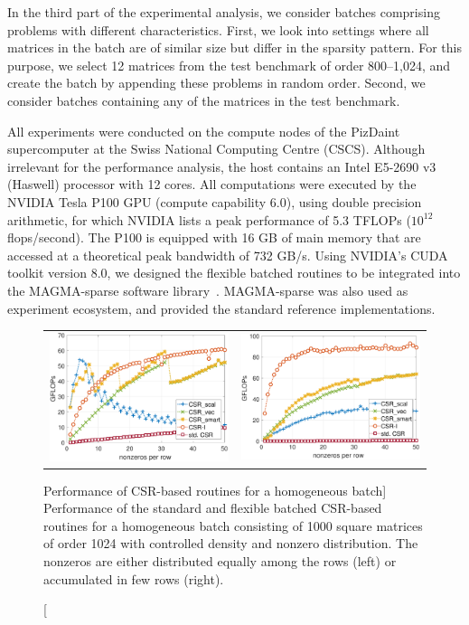 In the third part of the experimental analysis, we consider batches comprising 
problems
with different characteristics. First, we look into settings where all matrices 
in the batch are of
similar size but differ in the sparsity pattern. For this purpose, we select 12 
matrices from
the test benchmark of order
800--1,024, and create the batch by appending these problems in random order.
Second, we consider batches containing any of the matrices in the test 
benchmark.

All experiments were conducted on the compute nodes of the 
PizDaint supercomputer at the Swiss National Computing Centre (CSCS). 
Although irrelevant for the performance analysis, the host contains
an Intel E5-2690 v3 (Haswell) processor with 12 cores.
All computations were executed by the NVIDIA Tesla P100 GPU (compute capability 
6.0),
using double precision arithmetic,
for which NVIDIA lists a peak performance of 5.3 TFLOPs ($10^{12}$ 
flops/second). 
The P100 is equipped with 16 GB of main memory that
are accessed at a theoretical peak bandwidth of 732 GB/s.
Using NVIDIA's CUDA toolkit version 8.0, we designed the flexible batched 
routines to be integrated into the MAGMA-sparse software 
library~\cite{parco2017}.
MAGMA-sparse was also used as experiment ecosystem, and provided
the standard \spmv reference implementations. 


\begin{figure}[t]
	\begin{center}
		\begin{tabular}{cc}
			\includegraphics[width=.45\columnwidth]{plots/INCDENSITY_GFLOPS}
			&
			\includegraphics[width=.458\columnwidth]{plots/INC_GFLOPS}\\
		\end{tabular}
	\end{center}
	\caption
    [Performance of CSR-based \spmv routines for a homogeneous batch]
    {Performance of the standard and flexible batched CSR-based \spmv 
		routines for a homogeneous batch consisting of 1000 square matrices of 
		order 
		1024 with controlled density and nonzero distribution. 
		The nonzeros are either distributed equally among the rows (left) or 
		accumulated in few rows (right).}
	\label{2017-batched-spmv:fig:incdensity}
\end{figure}

